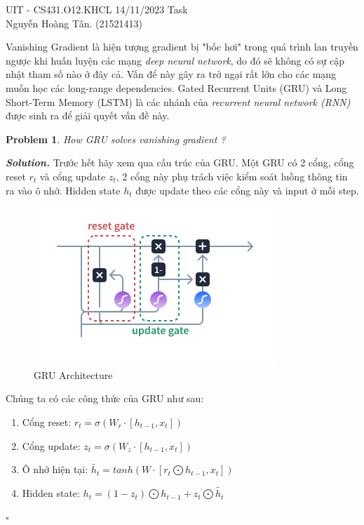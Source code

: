 \documentclass[12pt]{article}
\newtheorem{problem}{Problem}
\newenvironment{solution}[1][\it{Solution}]{\textbf{#1. } }{$\square$}
\begin{document}
\noindent UIT - CS431.O12.KHCL \hfill 14/11/2023 Task \\
Nguyễn Hoàng Tân. (21521413)

\hrulefill

Vanishing Gradient là hiện tượng gradient bị "bốc hơi" trong quá trình lan truyền ngược khi huấn luyện các mạng \textit{deep neural network}, do đó sẽ không có sự cập nhật tham số nào ở đây cả. Vấn để này gây ra trở ngại rất lớn cho các mạng muốn học các long-range dependencies. Gated Recurrent Units (GRU) và Long Short-Term Memory (LSTM) là các nhánh của \textit{recurrent neural network (RNN)} được sinh ra để giải quyết vấn đề này.

\begin{problem}
	How GRU solves vanishing gradient ?
\end{problem}
\begin{solution}
	Trước hết hãy xem qua cấu trúc của GRU. Một GRU có 2 cổng, cổng reset $r_t$ và cổng update $z_t$, 2 cổng này phụ trách việc kiểm soát luồng thông tin ra vào ô nhớ. Hidden state $h_t$ được update theo các cổng này và input ở mỗi step.
	\begin{figure}[h]
		\centering
		\includegraphics[scale=1]{Images/GRU_Architecture.png}
		\caption{GRU Architecture}
	\end{figure}

	Chúng ta có các công thức của GRU như sau: \\
	\begin{enumerate}
		\item Cổng reset: $r_t = \sigma(W_r \cdot [h_{t-1}, x_t])$
		\item Cổng update: $z_t = \sigma(W_z \cdot [h_{t-1}, x_t])$
		\item Ô nhớ hiện tại: $\tilde{h_t} = tanh(W \cdot [r_t \bigodot h_{t-1}, x_t])$
		\item Hidden state: $h_t = ( 1 - z_t ) \bigodot h_{t-1} + z_t \bigodot \tilde{h_t} $
	\end{enumerate}


\end{solution}
\end{document}
